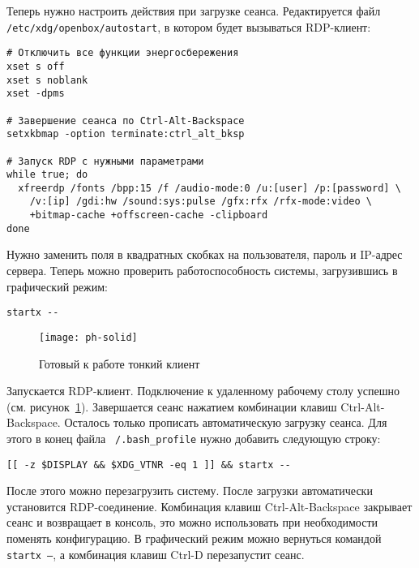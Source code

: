 Теперь нужно настроить действия при загрузке сеанса. Редактируется файл
\texttt{/etc/xdg/openbox/autostart}, в котором будет вызываться RDP-клиент:
\begin{verbatim}
# Отключить все функции энергосбережения
xset s off
xset s noblank
xset -dpms

# Завершение сеанса по Ctrl-Alt-Backspace
setxkbmap -option terminate:ctrl_alt_bksp

# Запуск RDP с нужными параметрами
while true; do
  xfreerdp /fonts /bpp:15 /f /audio-mode:0 /u:[user] /p:[password] \
    /v:[ip] /gdi:hw /sound:sys:pulse /gfx:rfx /rfx-mode:video \
    +bitmap-cache +offscreen-cache -clipboard
done
\end{verbatim}

Нужно заменить поля в квадратных скобках на пользователя, пароль и IP-адрес сервера.
Теперь можно проверить работоспособность системы, загрузившись в графический режим:
\begin{verbatim}
startx --
\end{verbatim}

\begin{figure}[p]
    \center
    \texttt{[image: ph-solid]}
    \caption{Готовый к работе тонкий клиент}
    \label{pic:ph-solid}
\end{figure}

Запускается RDP-клиент. Подключение к удаленному рабочему столу успешно (см.
рисунок~\ref{pic:ph-solid}). Завершается
сеанс нажатием комбинации клавиш Ctrl-Alt-Backspace. Осталось только прописать
автоматическую загрузку сеанса. Для этого в конец файла \texttt{~/.bash\_profile} нужно
добавить следующую строку:
\begin{verbatim}
[[ -z $DISPLAY && $XDG_VTNR -eq 1 ]] && startx --
\end{verbatim}

После этого можно перезагрузить систему. После загрузки автоматически установится
RDP-соединение. Комбинация клавиш Ctrl-Alt-Backspace закрывает сеанс и возвращает в
консоль, это можно использовать при необходимости поменять конфигурацию. В графический
режим можно вернуться командой \texttt{startx --}, а комбинация клавиш Ctrl-D
перезапустит сеанс.

